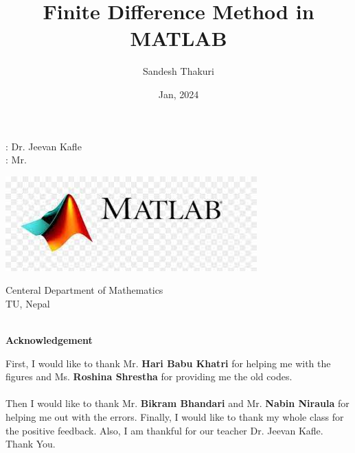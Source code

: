 \documentclass[a4paper,14pt,twoside,onecolumn,openany,final]{memoir}
\author{Sandesh Thakuri}
\title{Finite Difference Method in MATLAB}
\date{Jan, 2024}
\begin{document}
\frontmatter

  \vspace{2cm}

  \begin{center}
   {\bfseries { \LARGE
        \vspace{2cm}


         {\color{blue}{\thetitle}}}

        \vspace{1cm}

      {\large{\color{red!90}{For PDEs: Heat Equation, Advection-Diffiusion Equation,...}}



      \vspace{1.5cm}

      {\color{blue}{Tutor}}: \hspace{6mm} Dr. Jeevan Kafle \\
      {\color{blue}{Compiled by}}: \hspace{5mm} Mr. \theauthor\\


        \vspace{2cm}

        \includegraphics[scale=0.9]{logo.jpg}

        \vspace{2cm}

        Centeral Department of Mathematics\\
        TU, \; Nepal\\
        \thedate\\
}}
      \end{center}
    \clearpage


\begin{center}
  {\LARGE{\bfseries Acknowledgement}}
\end{center}

\vspace{1.5cm}
{\large
First, I would like to thank Mr. {\bfseries Hari Babu Khatri} for helping me with the figures and Ms. {\bfseries Roshina Shrestha} for providing me the old codes.\\ \\

 Then I would like to thank Mr. {\bfseries Bikram Bhandari} and Mr. {\bfseries Nabin Niraula} for helping me out with the errors. Finally, I would like to thank my whole class for the positive feedback. Also, I am thankful for our teacher Dr. Jeevan Kafle.\\

 Thank You.\\ \\

}
\begin{flushright}
  \theauthor \\
  \thedate
\end{flushright}
\end{document}
